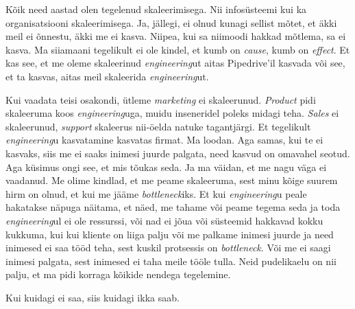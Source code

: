 Kõik need aastad olen tegelenud skaleerimisega. Nii infosüsteemi kui ka 
organisatsiooni skaleerimisega. Ja, jällegi, ei olnud kunagi sellist mõtet, et 
äkki meil ei õnnestu, äkki me ei kasva. Niipea, kui sa niimoodi hakkad mõtlema, 
sa ei kasva. Ma  siiamaani tegelikult ei ole kindel, et kumb on \emph{cause}, 
kumb on \emph{effect}. Et kas see, et me oleme skaleerinud \emph{engineering}ut 
aitas Pipedrive'il kasvada või see, et ta kasvas, aitas meil skaleerida 
\emph{engineering}ut.

Kui vaadata teisi osakondi, ütleme \emph{marketing} ei skaleerunud. 
\emph{Product} pidi skaleeruma koos \emph{engineering}uga, muidu inseneridel 
poleks midagi teha. \emph{Sales} ei skaleerunud, \emph{support} skaleerus 
nii-öelda natuke tagantjärgi. Et tegelikult \emph{engineering}u kasvatamine 
kasvatas firmat. Ma loodan. Aga samas, kui te ei kasvaks, siis me ei saaks  
inimesi juurde palgata, need kasvud on omavahel seotud. Aga küsimus ongi see, 
et mis tõukas seda. Ja ma väidan, et me nagu väga ei vaadanud. Me olime 
kindlad, et me peame skaleeruma, sest minu kõige suurem hirm on olnud, et  kui 
me jääme \emph{bottleneck}iks. Et kui \emph{engineering}u peale hakatakse 
näpuga näitama, et näed, me tahame või peame tegema seda ja toda 
\emph{engineering}ul ei ole ressurssi, või nad ei jõua või süsteemid hakkavad 
kokku kukkuma, kui kui kliente on liiga palju või me palkame inimesi juurde ja 
need inimesed ei saa tööd teha, sest kuskil protsessis on \emph{bottleneck}. 
Või me ei saagi inimesi palgata, sest inimesed ei taha meile tööle tulla. Neid 
pudelikaelu on nii palju, et ma pidi korraga kõikide nendega tegelemine. 

Kui kuidagi ei saa, siis kuidagi ikka saab.
